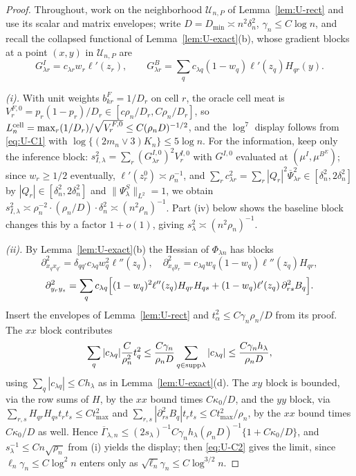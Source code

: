 \documentclass[11pt]{article}
\theoremstyle{definition}
\newcommand{\1}{\mathbf 1}\newcommand{\op}{\operatorname}
\begin{document}
\begin{proof}
Throughout, work on the neighborhood $\mathcal U_{n,P}$ of
Lemma~\ref{lem:U-rect} and use its scalar and matrix envelopes; write
$D=D_{\min}\asymp n^2\delta_n^2$, $\gamma_n\le C\log n$, and recall the
collapsed functional of Lemma~\ref{lem:U-exact}(b), whose gradient blocks at a
point $(x,y)$ in $\mathcal U_{n,P}$ are
\begin{equation}
G^{I}_{\lambda r}=c_{\lambda r}w_r\ell'(z_r),
\qquad
G^{B}_{\lambda r}=\sum_qc_{\lambda q}(1-w_q)\ell'(z_q)H_{qr}(y).
\label{eq:U-gradients}
\end{equation}

\emph{(i).}  With unit weights $b^F_{kr}=1/D_r$ on cell $r$, the oracle cell
meat is $V^{F,0}_r=p_r(1-p_r)/D_r\in[c\rho_n/D_r,C\rho_n/D_r]$, so
$L_n^{\rm cell}=\max_r(1/D_r)/\sqrt{V^{F,0}_r}\le C(\rho_nD)^{-1/2}$, and the
$\log^7$ display follows from \eqref{eq:U-C1} with
$\log\{(2m_n\vee3)K_n\}\le5\log n$.  For the information, keep only the
inference block:
$s_{I,\lambda}^2=\sum_r(G^{I,0}_{\lambda r})^2V^{I,0}_r$ with
$G^{I,0}$ evaluated at $(\mu^I,\mu^{B^E})$; since
$w_r\ge1/2$ eventually, $\ell'(z^0_r)\asymp\rho_n^{-1}$, and
$\sum_rc_{\lambda r}^2=\sum_r|Q_r|^2\overline\Psi_{\lambda r}^2
\in[\delta_n^2,2\delta_n^2]$ by $|Q_r|\in[\delta_n^2,2\delta_n^2]$ and
$\|\Psi_\lambda^S\|_{L^2}=1$, we obtain
$s_{I,\lambda}^2\asymp\rho_n^{-2}\cdot(\rho_n/D)\cdot\delta_n^2
\asymp(n^2\rho_n)^{-1}$.  Part (iv) below shows the baseline block changes this
by a factor $1+o(1)$, giving $s_\lambda^2\asymp(n^2\rho_n)^{-1}$.

\emph{(ii).}  By Lemma~\ref{lem:U-exact}(b) the Hessian of
$\Phi_{\lambda n}$ has blocks
\[
\partial^2_{x_qx_{q'}}=\delta_{qq'}c_{\lambda q}w_q^2\ell''(z_q),
\quad
\partial^2_{x_qy_r}=c_{\lambda q}w_q(1-w_q)\ell''(z_q)H_{qr},
\]
\[
\partial^2_{y_ry_s}
=\sum_qc_{\lambda q}\Bigl[(1-w_q)^2\ell''(z_q)H_{qr}H_{qs}
+(1-w_q)\ell'(z_q)\,\partial^2_{rs}B_q\Bigr].
\]
Insert the envelopes of Lemma~\ref{lem:U-rect} and
$t_\alpha^2\le C\gamma_n\rho_n/D$ from its proof.  The $xx$ block contributes
\[
\sum_q|c_{\lambda q}|\frac{C}{\rho_n^2}t_q^2
\le\frac{C\gamma_n}{\rho_nD}\sum_{q\in{\rm supp}\lambda}|c_{\lambda q}|
\le\frac{C\gamma_nh_\lambda}{\rho_nD},
\]
using $\sum_q|c_{\lambda q}|\le Ch_\lambda$ as in
Lemma~\ref{lem:U-exact}(d).  The $xy$ block is bounded, via the row sums of
$H$, by the $xx$ bound times $C\kappa_0/D$, and the $yy$ block, via
$\sum_{r,s}H_{qr}H_{qs}t_rt_s\le Ct_{\max}^2$ and
$\sum_{r,s}|\partial^2_{rs}B_q|t_rt_s\le Ct_{\max}^2/\rho_n$, by the $xx$
bound times $C\kappa_0/D$ as well.  Hence
$\overline\Gamma_{\lambda,n}\le
(2s_\lambda)^{-1}C\gamma_nh_\lambda(\rho_nD)^{-1}\{1+C\kappa_0/D\}$, and
$s_\lambda^{-1}\le Cn\sqrt{\rho_n}$ from (i) yields the display; then
\eqref{eq:U-C2} gives the limit, since $\ell_n\gamma_n\le C\log^2n$ enters only
as $\sqrt{\ell_n}\gamma_n\le C\log^{3/2}n$.


\end{proof}
\end{document}
